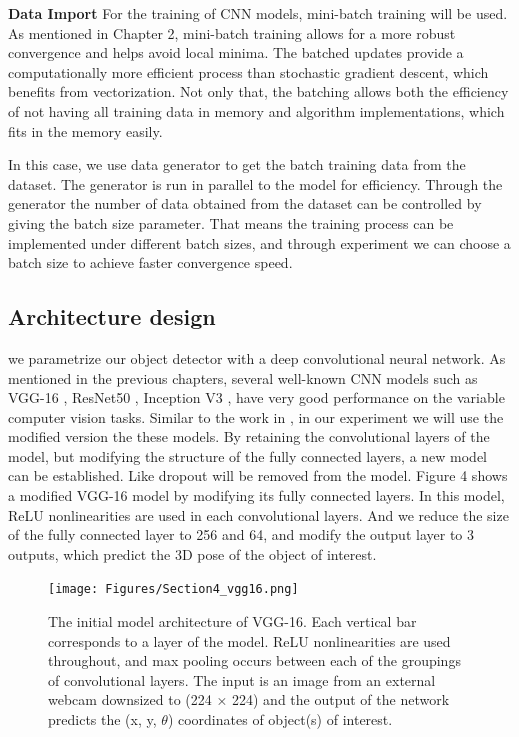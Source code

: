 \textbf{Data Import}
For the training of CNN models, mini-batch training \cite{li2014efficient} will be used. As mentioned in Chapter 2, mini-batch training allows for a more robust convergence and helps avoid local minima. The batched updates provide a computationally more efficient process than stochastic gradient descent, which benefits from vectorization. Not only that, the batching allows both the efficiency of not having all training data in memory and algorithm implementations, which fits in the memory easily.

In this case, we use data generator to get the batch training data from the dataset. The generator is run in parallel to the model for efficiency. Through the generator the number of data obtained from the dataset can be controlled by giving the batch size parameter. That means the training process can be implemented under different batch sizes, and through experiment we can choose a batch size to achieve faster convergence speed.


\subsection{Architecture design}

we parametrize our object detector with a deep convolutional neural network. As mentioned in the previous chapters, several well-known CNN models such as VGG-16 \cite{simonyan2014very}, ResNet50 \cite{he2016deep}, Inception V3 \cite{szegedy2016rethinking}, have very good performance on the variable computer vision tasks. Similar to the work in \cite{tobin2017domain}, in our experiment we will use the modified version the these models. By retaining the convolutional layers of the model, but modifying the structure of the fully connected layers, a new model can be established. Like \cite{tobin2017domain} dropout will be removed from the model.  Figure 4 shows a modified VGG-16 model by modifying its fully connected layers. In this model, ReLU nonlinearities are used in each convolutional layers. And we reduce the size of the fully connected layer to 256 and 64, and modify the output layer to 3 outputs, which predict the 3D pose of the object of interest.

\begin{figure}[h]
	\texttt{[image: Figures/Section4\_vgg16.png]} 
	\centering
	\caption{The initial model architecture of VGG-16. Each vertical bar corresponds to a layer of the model. ReLU nonlinearities are used throughout, and max pooling occurs between each of the groupings of convolutional layers. The input is an image from an external webcam downsized to (224 × 224) and the output of the network predicts the (x, y, $\theta$) coordinates of object(s) of interest.}
	\label{fig:vgg161}
\end{figure}

